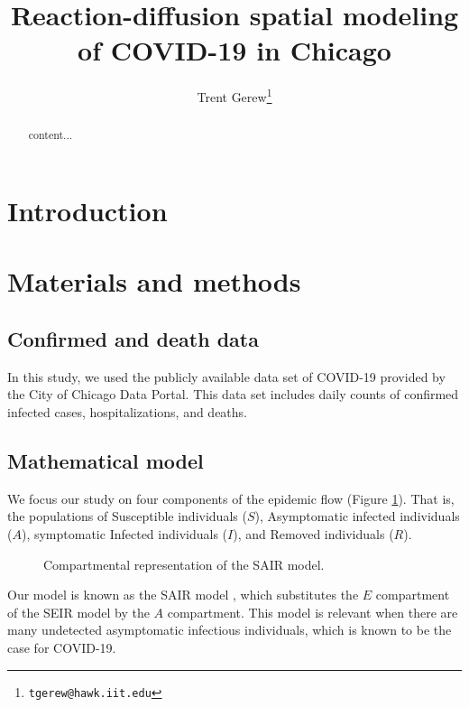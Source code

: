 \documentclass[11pt]{article}
\title{Reaction-diffusion spatial modeling of COVID-19 in Chicago}
\author{Trent Gerew\thanks{\texttt{tgerew@hawk.iit.edu}}}
\institute{Department of Applied Mathematics, Illinois Institute of Technology, Chicago, Illinois}
\begin{document}
\maketitle

\begin{abstract}
	content...
\end{abstract}

\section{Introduction}

\section{Materials and methods}
	\subsection{Confirmed and death data}
		In this study, we used the publicly available data set of COVID-19 provided by the City of Chicago Data Portal.
		This data set includes daily counts of confirmed infected cases, hospitalizations, and deaths.
	
	\subsection{Mathematical model}
		We focus our study on four components of the epidemic flow (Figure \ref{fig:model}).
		That is, the populations of Susceptible individuals ($S$), Asymptomatic infected individuals ($A$), symptomatic Infected individuals ($I$), and Removed individuals ($R$).
		\begin{figure}[h]
			\centering
			\caption{Compartmental representation of the SAIR model.}
			\label{fig:model}
		\end{figure}
		Our model is known as the SAIR model \cite{s+t+spain}, which substitutes the $E$ compartment of the SEIR model by the $A$ compartment.
		This model is relevant when there are many undetected asymptomatic infectious individuals, which is known to be the case for COVID-19.
		
\end{document}
